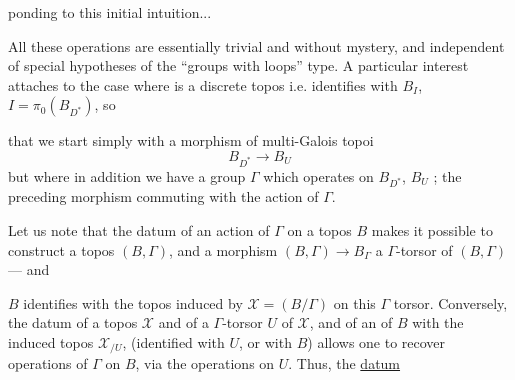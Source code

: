 ponding to this initial intuition...


All these operations are essentially
trivial and without mystery, and independent of
 special hypotheses of the ``groups with
loops'' type. A particular interest attaches
to the case where  is a discrete topos i.e.
identifies with $B_I$,  $I=\pi_0(B_{D^*})$, so


that we start simply with a morphism
of multi-Galois topoi
\[
 B_{D^*}\longrightarrow B_U
\]
but where in addition we have a group $\Gamma$
which operates on $B_{D^*}$, $B_U$ ; the preceding
morphism commuting with the action of $\Gamma$.

Let us note that the datum of an action
of $\Gamma$ on a topos $B$ makes it possible to
construct a topos $(B,\Gamma)$, and
a morphism $(B,\Gamma)\longrightarrow B_\Gamma$
 a $\Gamma$-torsor of $(B,\Gamma)$ --- and

$B$ identifies with the topos induced by
$\mathcal X=(B/\Gamma)$ on this $\Gamma$ torsor. Conversely,
the datum of a topos $\mathcal X$ and of a
$\Gamma$-torsor $U$ of $\mathcal X$, and of an
 of $B$ with the induced topos
$\mathcal X_{/U}$,  (identified with $U$, or with $B$) allows
one to recover operations of $\Gamma$ on $B$,
via the operations on $U$. Thus, the \uline{datum}

